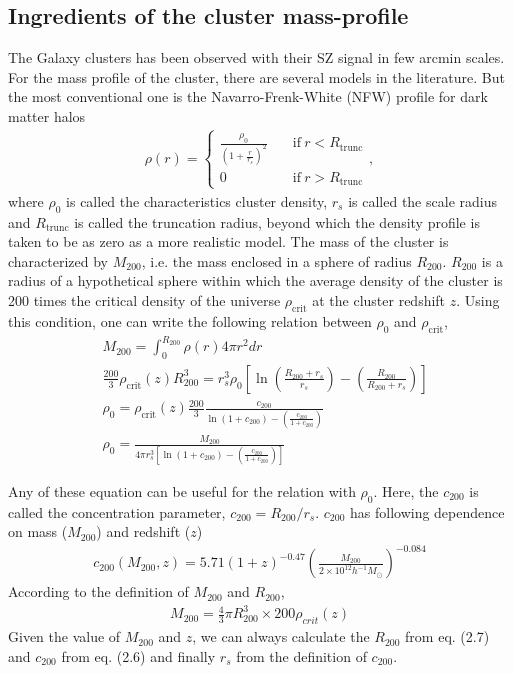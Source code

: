 \documentclass[12pt,letterpaper]{article}
\numberwithin{equation}{section}
\begin{document}
\subsection{\textbf{Ingredients of the cluster mass-profile}}
The Galaxy clusters has been observed with their SZ signal in few arcmin scales. For the mass profile of the cluster, there are several models in the literature. But the most conventional one is the Navarro-Frenk-White (NFW) profile \cite{Navarro:1995iw} for dark matter halos 
\begin{align}
    \rho(r) = \begin{cases}
               \frac{\rho_0}{(1+\frac{r}{r_s})^2} &\quad \text{if} \ r < R_{\text{trunc}} \\
               0  &\quad \text{if} \ r > R_{\text{trunc}}
               \end{cases},
\end{align}
where $\rho_0$ is called the characteristics cluster density, $r_s$ is called the scale radius and $R_{\text{trunc}}$ is called the truncation radius, beyond which the density profile is taken to be as zero as a more realistic model. The mass of the cluster is characterized by  $M_{200}$, i.e. the mass enclosed in a sphere of radius $R_{200}$. $R_{200}$ is a radius of a hypothetical sphere within which the average density of the cluster is 200 times the critical density of the universe $\rho_{\text{crit}}$ at the cluster redshift $z$. Using this condition, one can write the following relation between $\rho_0$ and $\rho_{\text{crit}}$,
\begin{align}
    &M_{200} = \int_0^{R_{200}}\rho(r) 4\pi r^2 dr \\
    &\frac{200}{3}\rho_{\text{crit}}(z)R_{200}^3 = r_s^3 \rho_0 \left[ \ln{\left(\frac{R_{200}+r_s}{r_s}\right)} - \left(\frac{R_{200}}{R_{200} + r_s}\right) \right] \\
    &\rho_0 = \rho_{\text{crit}}(z) \frac{200}{3}\frac{c_{200}}{\ln{(1+c_{200})}-\left(\frac{c_{200}}{1+c_{200}}\right)}\\
    &\rho_0 = \frac{M_{200}}{4\pi r_s^3 \left[\ln{(1+c_{200})}-\left(\frac{c_{200}}{1+c_{200}}\right)\right]}
\end{align}

Any of these equation can be useful for the relation with $\rho_0$. Here, the $c_{200}$ is called the concentration parameter, $c_{200} = R_{200}/r_s$. $c_{200}$ has following dependence on mass ($M_{200}$) and redshift ($z$) \cite{Geach:2017crt, Duffy:2008pz}
\begin{align}
    c_{200}(M_{200}, z) = 5.71(1+z)^{-0.47}\left(\frac{M_{200}}{2\times10^{12}h^{-1}M_{\odot}}\right)^{-0.084}
\end{align}\label{c200}
According to the definition of $M_{200}$ and $R_{200}$,
\begin{align}
    M_{200} = \frac{4}{3}\pi R_{200}^3 \times 200\rho_{crit}(z)
\end{align}\label{R_200}
Given the value of $M_{200}$ and $z$, we can always calculate the $R_{200}$ from eq. (2.7) and $c_{200}$ from eq. (2.6) and finally $r_{s}$ from the definition of $c_{200}$.
\end{document}
